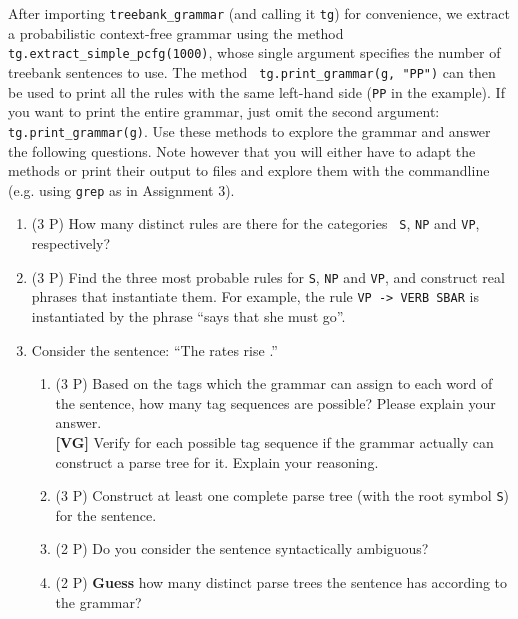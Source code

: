 \documentclass[11pt]{article}
\begin{document}
\begin{center}
\fbox{

}
\end{center}
After importing {\tt treebank\_grammar} (and calling it {\tt tg}) for
convenience, we extract a probabilistic context-free grammar using the
method {\tt tg.extract\_simple\_pcfg(1000)}, whose single argument
specifies the number of treebank sentences to use. The method {\tt
  tg.print\_grammar(g, "PP")} can then be used to print all the rules
with the same left-hand side ({\tt PP} in the example). If you want to
print the entire grammar, just omit the second argument: {\tt
  tg.print\_grammar(g)}. Use these methods to explore the grammar and
answer the following questions. Note however that you will either have
to adapt the methods or print their output to files and explore them
with the commandline (e.g. using {\tt grep} as in Assignment 3).
\begin{enumerate}[topsep=0.2cm,itemsep=0cm]
\item (3 P) How many distinct rules are there for the categories {\tt
    S}, {\tt NP} and {\tt VP}, respectively?
\item (3 P) Find the three most probable rules for {\tt S}, {\tt NP}
  and {\tt VP}, and construct real phrases that instantiate them.  For
  example, the rule {\tt VP -> VERB SBAR} is instantiated by the
  phrase ``says that she must go''.
\item Consider the sentence: ``The rates rise .''
  \begin{enumerate}[noitemsep,topsep=0cm]
  \item (3 P) Based on the tags which the grammar can assign to each
    word of the sentence, how many tag sequences are possible? Please
    explain your answer.\\
    \textbf{[VG]} Verify for each possible tag sequence if the grammar
    actually can construct a parse tree for it. Explain your reasoning.
\item (3 P) Construct at least one complete parse tree (with the root
  symbol {\tt S}) for the sentence.
\item (2 P) Do you consider the sentence syntactically ambiguous?
\item (2 P) \textbf{Guess} how many distinct parse trees the sentence
  has according to the grammar?
\end{enumerate}
\end{enumerate}
\end{document}
